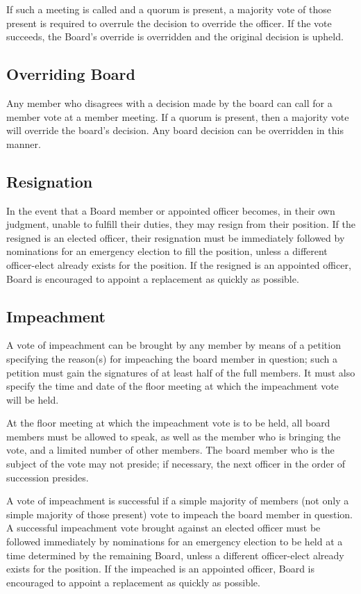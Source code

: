 \documentclass[12pt]{amsart}
\begin{document}
If such a meeting is called and a quorum is present, a majority vote of those present is required to overrule the decision to override the officer. If the vote succeeds, the Board's override is overridden and the original decision is upheld.
\subsection{Overriding Board}
Any member who disagrees with a decision made by the board can call for a member vote at a member meeting. If a quorum is present, then a majority vote will override the board's decision. Any board decision can be overridden in this manner.
	\subsection {Resignation}
In the event that a Board member or appointed officer becomes, in their own judgment, unable to fulfill their duties, they may resign from their position. If the resigned is an elected officer, their resignation must be immediately followed by nominations for an emergency election to fill the position, unless a different officer-elect already exists for the position. If the resigned is an appointed officer, Board is encouraged to appoint a replacement as quickly as possible.
	\subsection {Impeachment}
A vote of impeachment can be brought by any member by means of a petition specifying the reason(s) for impeaching the board member in question; such a petition must gain the signatures of at least half of the full members. It must also specify the time and date of the floor meeting at which the impeachment vote will be held.

At the floor meeting at which the impeachment vote is to be held, all board members must be allowed to speak, as well as the member who is bringing the vote, and a limited number of other members. The board member who is the subject of the vote may not preside; if necessary, the next officer in the order of succession presides. 

A vote of impeachment is successful if a simple majority of members (not only a simple majority of those present) vote to impeach the board member in question. A successful impeachment vote brought against an elected officer must be followed immediately by nominations for an emergency election to be held at a time determined by the remaining Board, unless a different officer-elect already exists for the position. If the impeached is an appointed officer, Board is encouraged to appoint a replacement as quickly as possible.
\end{document}
